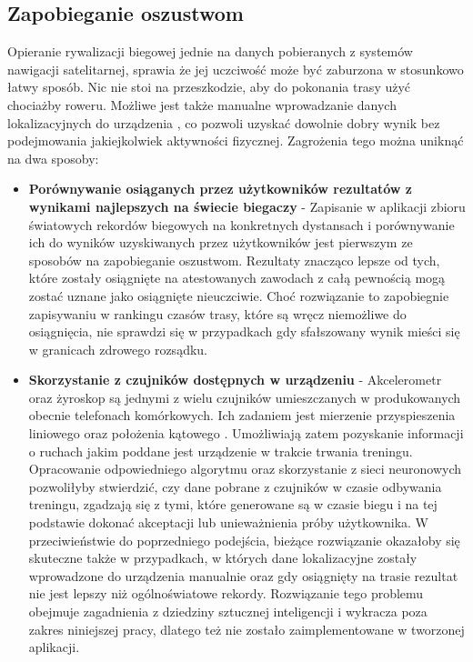 \subsection{Zapobieganie oszustwom}
Opieranie rywalizacji biegowej jednie na danych pobieranych z systemów nawigacji satelitarnej, sprawia że jej uczciwość może być zaburzona w stosunkowo łatwy sposób. Nic nie stoi na przeszkodzie, aby do pokonania trasy użyć chociażby roweru. Możliwe jest także manualne wprowadzanie danych lokalizacyjnych do urządzenia \cite{fakegps}, co pozwoli uzyskać dowolnie dobry wynik bez podejmowania jakiejkolwiek aktywności fizycznej. Zagrożenia tego można uniknąć na dwa sposoby:
\begin{itemize}
\item{\textbf{Porównywanie osiąganych przez użytkowników rezultatów z wynikami najlepszych na świecie biegaczy}} - Zapisanie w aplikacji zbioru światowych rekordów biegowych na konkretnych dystansach i porównywanie ich do wyników uzyskiwanych przez użytkowników jest pierwszym ze sposobów na zapobieganie oszustwom. Rezultaty znacząco lepsze od tych, które zostały osiągnięte na atestowanych zawodach z całą pewnością mogą zostać uznane jako osiągnięte nieuczciwie. Choć rozwiązanie to zapobiegnie zapisywaniu w rankingu czasów trasy, które są wręcz niemożliwe do osiągnięcia, nie sprawdzi się w przypadkach gdy sfałszowany wynik mieści się w granicach zdrowego rozsądku.
\item{\textbf{Skorzystanie z czujników dostępnych w urządzeniu}} - Akcelerometr oraz żyroskop są jednymi z wielu czujników umieszczanych w produkowanych obecnie telefonach komórkowych. Ich zadaniem jest mierzenie przyspieszenia liniowego oraz położenia kątowego \cite{czujniki}. Umożliwiają zatem pozyskanie informacji o ruchach jakim poddane jest urządzenie w trakcie trwania treningu. Opracowanie odpowiedniego algorytmu oraz skorzystanie z sieci neuronowych pozwoliłyby stwierdzić, czy dane pobrane z czujników w czasie odbywania treningu, zgadzają się z tymi, które generowane są w czasie biegu i na tej podstawie dokonać akceptacji lub unieważnienia próby użytkownika. W przeciwieństwie do poprzedniego podejścia, bieżące rozwiązanie okazałoby się skuteczne także w przypadkach, w których dane lokalizacyjne zostały wprowadzone do urządzenia manualnie oraz gdy osiągnięty na trasie rezultat nie jest lepszy niż ogólnoświatowe rekordy. Rozwiązanie tego problemu obejmuje zagadnienia z dziedziny sztucznej inteligencji i wykracza poza zakres niniejszej pracy, dlatego też nie zostało zaimplementowane w tworzonej aplikacji.
\end{itemize}

